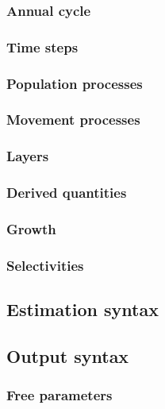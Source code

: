 \subsubsection*{Annual cycle}
\subsubsection*{Time steps}
\subsubsection*{Population processes}
\subsubsection*{Movement processes}
\subsubsection*{Layers}
\subsubsection*{Derived quantities}
\subsubsection*{Growth}
\subsubsection*{Selectivities}
\subsection*{Estimation syntax}
\subsection*{Output syntax}
\subsubsection*{Free parameters}
